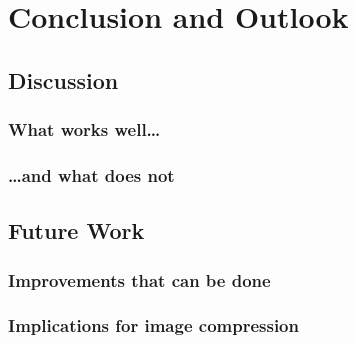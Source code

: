 \chapter{Conclusion and Outlook}

\label{ch:Conclusion}

\section{Discussion}
\subsection{What works well\dots}
\subsection{\dots and what does not}
\section{Future Work}
\subsection{Improvements that can be done}
\subsection{Implications for image compression}
